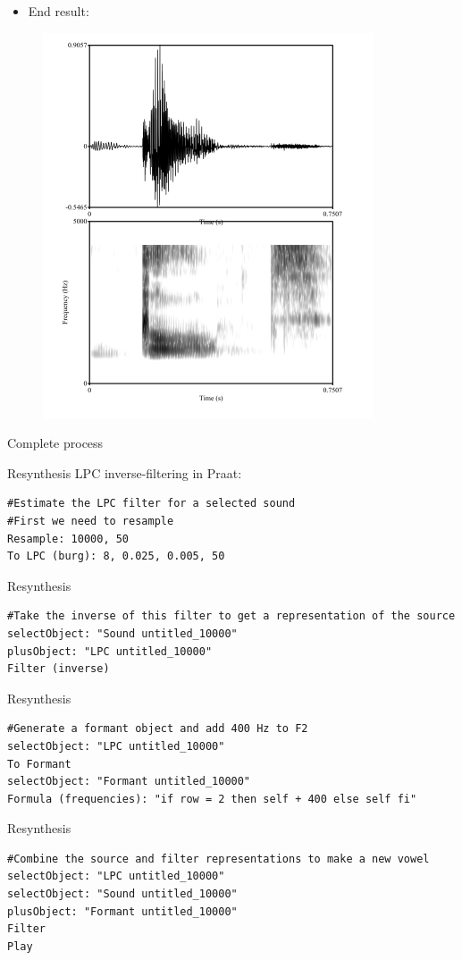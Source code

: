 \documentclass{beamer}
\begin{document}
\begin{frame}
\begin{itemize}
\item{End result:}
\end{itemize}
\begin{figure}
\includegraphics[scale=0.5,keepaspectratio]{final.png}
\end{figure}
\end{frame}
\begin{frame}{Complete process}
\end{frame}
\begin{frame}[fragile]{Resynthesis}
LPC inverse-filtering in Praat:
\begin{lstlisting}
#Estimate the LPC filter for a selected sound
#First we need to resample
Resample: 10000, 50
To LPC (burg): 8, 0.025, 0.005, 50
\end{lstlisting}
\end{frame}
\begin{frame}[fragile]{Resynthesis}
\begin{lstlisting}
#Take the inverse of this filter to get a representation of the source
selectObject: "Sound untitled_10000"
plusObject: "LPC untitled_10000"
Filter (inverse)
\end{lstlisting}
\end{frame}
\begin{frame}[fragile]{Resynthesis}
\begin{lstlisting}
#Generate a formant object and add 400 Hz to F2
selectObject: "LPC untitled_10000"
To Formant
selectObject: "Formant untitled_10000"
Formula (frequencies): "if row = 2 then self + 400 else self fi"
\end{lstlisting}
\end{frame}
\begin{frame}[fragile]{Resynthesis}
\begin{lstlisting}
#Combine the source and filter representations to make a new vowel
selectObject: "LPC untitled_10000"
selectObject: "Sound untitled_10000"
plusObject: "Formant untitled_10000"
Filter
Play
\end{lstlisting}
\end{frame}
\end{document}
